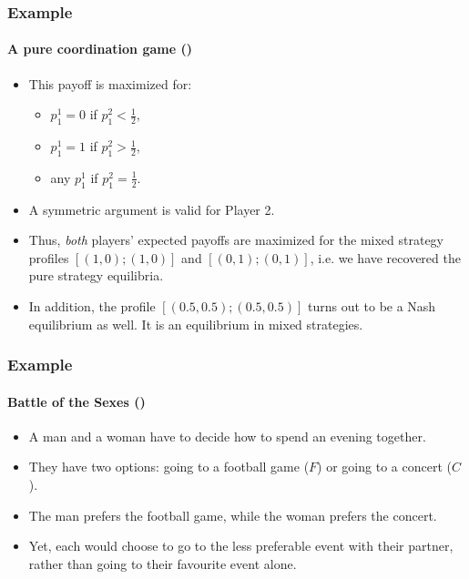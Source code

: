 \documentclass[10pt]{beamer}
\theoremstyle{definition}
\begin{document}
\begin{frame}[fragile]
\frametitle{Example }
\framesubtitle{A pure coordination game ()}
\begin{itemize}\itemsep1em
\item This payoff is maximized for:
	\begin{itemize}\itemsep1em
	\item $ p^1_1 = 0 $ if $ p^2_1 < \frac{1}{2} $,
	\item $ p^1_1 = 1 $ if $ p^2_1 > \frac{1}{2} $,
	\item any $ p^1_1 $ if $ p^2_1 = \frac{1}{2} $.
	\end{itemize} 
\item A symmetric argument is valid for Player 2.
\item Thus, \emph{both} players' expected payoffs are maximized for the mixed strategy profiles $ [(1,0); (1,0)] $ and $ [(0,1); (0,1)] $, i.e. we have recovered the pure strategy equilibria.
\item In addition, the profile $ [(0.5,0.5); (0.5,0.5)] $ turns out to be a Nash equilibrium as well. It is an equilibrium in mixed strategies.
\end{itemize}
\end{frame}



\begin{frame}[fragile]\setcounter{slidenum}{1}
\frametitle{Example }
\framesubtitle{Battle of the Sexes ()}
\begin{itemize}\itemsep1em
\item A man and a woman have to decide how to spend an evening together.
\item They have two options: going to a football game ($ F $) or going to a concert ($ C $).
\item The man prefers the football game, while the woman prefers the concert.
\item Yet, each would choose to go to the less preferable event with their partner, rather than going to their favourite event alone.
\end{itemize}
\end{frame}
\end{document}
